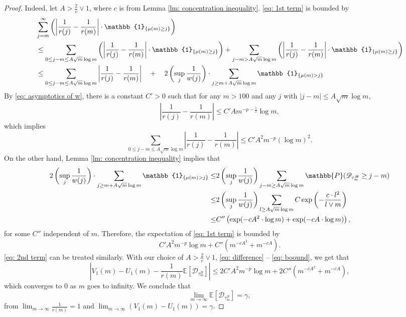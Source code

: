 \documentclass[EJP]{ejpecp} %
\newcommand{\abs}[1]{\left\vert #1 \right\vert}
\begin{document}
\begin{proof}
	Indeed, let $A> \frac{2}{c} \vee 1$, where $c$ is from Lemma \ref{lm: concentration inequality}. \eqref{eq: 1st term} is bounded by
	\begin{align*}
		& \sum_{j=m}^{\infty} \left(\abs{\frac{1}{r(j)} -\frac{1}{r(m)} } \cdot \mathbb{1}_{\left\{\mu(m)\geq j \right\}}\right)\\
		& \leq  \sum_{0\leq j-m \leq A \sqrt{m}\log m } \left(\abs{\frac{1}{r(j)} -\frac{1}{r(m)} } \cdot \mathbb{1}_{\left\{\mu(m)\geq j \right\}}\right)
		+  \sum_{j-m > A\sqrt{m}\log m } \left(\abs{\frac{1}{r(j)} -\frac{1}{r(m)} } \cdot \mathbb{1}_{\left\{\mu(m)\geq j \right\}}\right)
		\notag
		\\
		&\leq  \sum_{0\leq j-m \leq A\sqrt{m}\log m } \abs{\frac{1}{r(j)} -\frac{1}{r(m)} }
		\quad +\quad 2\left(\sup_j \frac{1}{w(j)}\right) \cdot \sum_{j\geq m + A\sqrt{m}\log m } \mathbb{1}_{\left\{ \mu(m) > j \right\}}
		\label{eq: low large difference}
	\end{align*}
	By \eqref{eq: asymptotics of w}, there is a constant $C'>0$ such that for any $m>100 $ and any $j$ with $\abs{j-m}\leq A \sqrt m \log m $, 
	\[ \abs{\frac{1}{r(j)} -\frac{1}{r(m)} } \leq C' A m^{-p-\frac{1}{2}} \log m, \]
	which implies
	\[
	\sum_{0\leq j-m \leq A\sqrt{m}\log m } \abs{\frac{1}{r(j)} -\frac{1}{r(m)} } \le 
	C' A^2 m^{-p} (\log m)^2.
	\] On the other hand, Lemma \ref{lm: concentration inequality} implies that
	\begin{align*}
		2\left(\sup_j \frac{1}{w(j)}\right) \cdot \sum_{j\geq m + A\sqrt{m}\log m } \mathbb{1}_{\left\{ \mu(m) > j \right\}}
		\le & 2\left(\sup_j \frac{1}{w(j)}\right) \sum_{j-m \geq A \sqrt m \log m  } \mathbb{P}( \mathscr{D}_{\tau^{\mathscr{B}}_m} \geq j-m )  
		\notag 
		\\
		\leq& 2\left(\sup_j \frac{1}{w(j)}\right) \sum_{l \geq A \sqrt m \log m } C \exp\left( - \frac{c  \cdot l^2}{l \vee m}   \right)
		\notag\\
		\leq& C'' \left( \exp (- cA^2 \cdot \log m ) + \exp(-cA \cdot \log m) \right), 
	\end{align*} for some $C''$ independent of $m$. Therefore, the expectation of \eqref{eq: 1st term} is bounded by
	\begin{equation}\label{eq: boound}
		C' A^2 m^{-p} \log m + C''  \left( m ^{-cA^2} +  m^{-cA} \right). 
	\end{equation}
	\eqref{eq: 2nd term} can be treated similarly. With our choice of $A >\frac{2}{c} \vee 1$,
	\eqref{eq: difference} -- 
	\eqref{eq: boound}, we get that
	$$ \abs{ V_1(m)- U_1(m) -\frac{1}{r(m)}\mathbb{E}\left[ \mathscr{D}_{\tau^{\mathscr{B}}_m} \right] }
	\leq 2C' A^2 m^{-p} \log m + 2C''  \left( m ^{-cA^2} +  m^{-cA} \right), 
	$$ 
	which converges to $0$ as $m$ goes to infinity. We conclude that 
	\[
	\lim_{m\to\infty}\mathbb{E}\left[ \mathscr{D}_{\tau^{\mathscr{B}}_m} \right] = \gamma, 
	\] 
	from $\lim_{m\to\infty}\frac{1}{r(m)} =1$ and $ \lim_{m\to \infty} \left(V_1(m)-U_1(m) \right) = \gamma$.
\end{proof}
\end{document}

